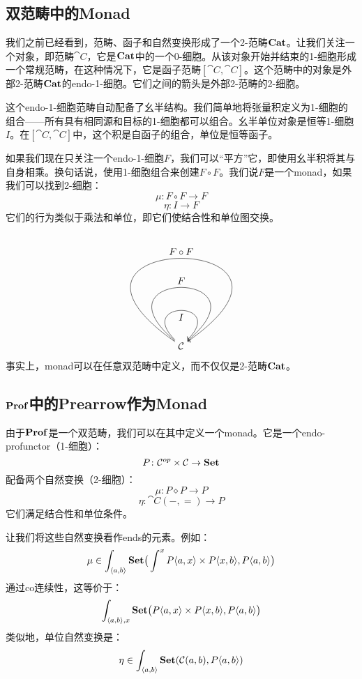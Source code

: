 \documentclass[DaoFP]{subfiles}
\begin{document}
\subsection{双范畴中的Monad}

我们之前已经看到，范畴、函子和自然变换形成了一个2-范畴$\mathbf{Cat}$。让我们关注一个对象，即范畴$\cat C$，它是$\mathbf{Cat}$中的一个0-细胞。从该对象开始并结束的1-细胞形成一个常规范畴，在这种情况下，它是函子范畴$[\cat C, \cat C]$。这个范畴中的对象是外部2-范畴$\mathbf{Cat}$的endo-1-细胞。它们之间的箭头是外部2-范畴的2-细胞。

这个endo-1-细胞范畴自动配备了幺半结构。我们简单地将张量积定义为1-细胞的组合——所有具有相同源和目标的1-细胞都可以组合。幺半单位对象是恒等1-细胞$I$。在$[\cat C, \cat C]$中，这个积是自函子的组合，单位是恒等函子。

如果我们现在只关注一个endo-1-细胞$F$，我们可以“平方”它，即使用幺半积将其与自身相乘。换句话说，使用1-细胞组合来创建$F \circ F$。我们说$F$是一个monad，如果我们可以找到2-细胞：
\[ \mu \colon F \circ F \to F \]
\[ \eta \colon I \to F \]
它们的行为类似于乘法和单位，即它们使结合性和单位图交换。
\[
   \begin{tikzpicture}
        \node [] (star) {$\cat C$} ;
        \path[->,draw] (star) to  [in=45,out=135, loop,distance=2cm] node[ below] {$I$} (star);
        \path[->,draw] (star) to  [in=40,out=140, loop,distance=4cm] node[above] {$F$} (star);
        \path[->,draw] (star) to  [ in=35,out=145, loop,distance=7cm] node[auto] {$F \circ F$} (star);
    \end{tikzpicture}
\]
事实上，monad可以在任意双范畴中定义，而不仅仅是2-范畴$\mathbf{Cat}$。

\subsection{$\mathbf{Prof}$中的Prearrow作为Monad}

由于$\mathbf{Prof}$是一个双范畴，我们可以在其中定义一个monad。它是一个endo-profunctor（1-细胞）：
\[ P \colon \mathcal{C}^{op} \times \mathcal{C} \to \mathbf{Set} \]
配备两个自然变换（2-细胞）：
\[ \mu \colon P \diamond P \to P \]
\[ \eta \colon \cat C(-, =) \to P \]
它们满足结合性和单位条件。

让我们将这些自然变换看作ends的元素。例如：
\[ \mu \in \int_{\langle a, b \rangle} \mathbf{Set} \big( \int^x P \langle a, x \rangle \times P \langle x, b \rangle,  P\langle a, b \rangle \big) \]
通过co连续性，这等价于：
\[ \int_{\langle a, b \rangle, x} \mathbf{Set} \big(P \langle a, x \rangle \times P \langle x, b \rangle,  P\langle a, b \rangle \big) \]
类似地，单位自然变换是：
\[ \eta \in \int_{\langle a, b \rangle} \mathbf{Set} (\mathcal{C}(a, b), P\langle a, b \rangle) \]
\end{document}
